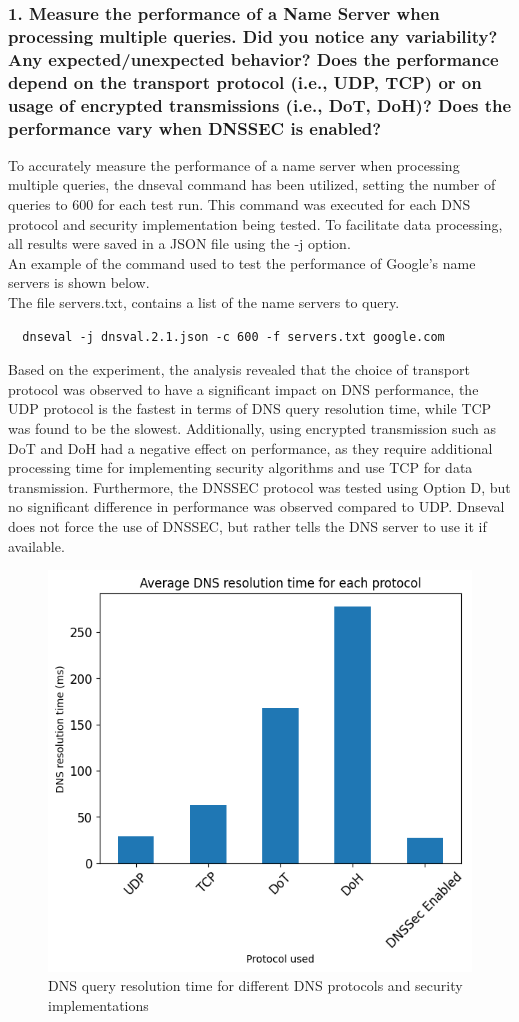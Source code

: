 \documentclass[eng]{class}
\begin{document}
\subsubsection*{1. Measure the performance of a Name Server when processing multiple queries. Did
    you notice any variability? Any expected/unexpected behavior? Does the
    performance depend on the transport protocol (i.e., UDP, TCP) or on usage of
    encrypted transmissions (i.e., DoT, DoH)? Does the performance vary when
    DNSSEC is enabled?}
To accurately measure the performance of a name server when processing multiple queries,
the dnseval command has been utilized, setting the number of queries to 600 for each test run.
This command was executed for each DNS protocol and security implementation being tested.
To facilitate data processing, all results were saved in a JSON file using the -j option.\\
An example of the command used to test the performance of Google's name servers is shown below.\\
The file servers.txt, contains a list of the name servers to query.
\begin{lstlisting}
  dnseval -j dnsval.2.1.json -c 600 -f servers.txt google.com
\end{lstlisting}
Based on the experiment, the analysis revealed that  the choice of transport protocol was observed to have a significant impact on DNS performance,
the UDP protocol is the fastest in terms of DNS query resolution time, while TCP was found to be the slowest.
Additionally, using encrypted transmission such as DoT and DoH had a negative effect on performance,
as they require additional processing time for implementing security algorithms and use TCP for data transmission.
Furthermore, the DNSSEC protocol was tested using Option D, but no significant difference in performance was observed compared to UDP.
Dnseval does not force the use of DNSSEC, but rather tells the DNS server to use it if available.

\begin{figure}[H]
    \centering
    \includegraphics[width=.7\columnwidth]{images/avgLat2.1.png}
    \caption{DNS query resolution time for different DNS protocols and security implementations}
    \label{fig-5}
\end{figure}
\end{document}
